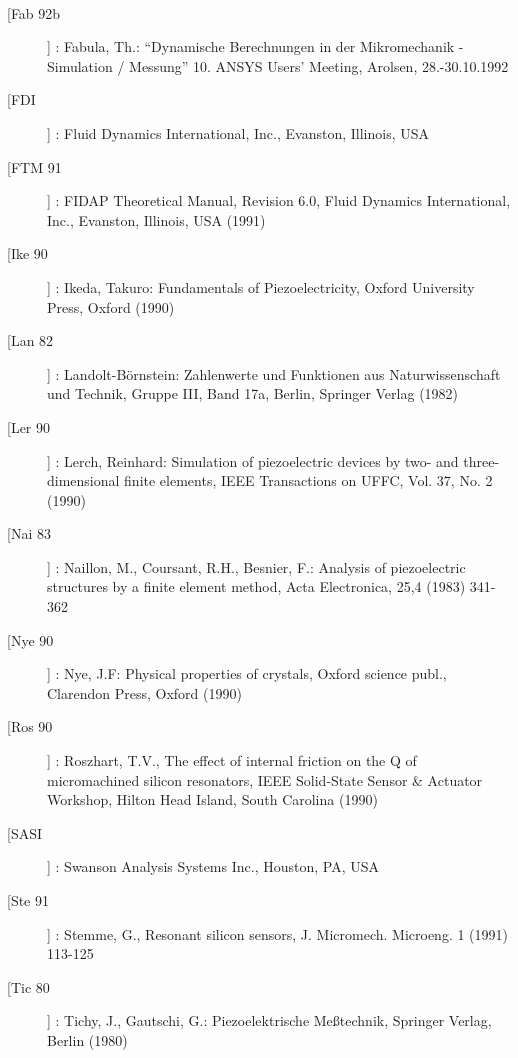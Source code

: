 \begin{description}
\\
\item[[Fab 92b]] : Fabula, Th.: ``Dynamische Berechnungen in der Mikromechanik - Simulation / Messung'' 10.  ANSYS Users' Meeting, Arolsen, 28.-30.10.1992
\\
\item[[FDI]] : Fluid Dynamics International, Inc., Evanston, Illinois, USA
\\
\item[[FTM 91]] : FIDAP Theoretical Manual, Revision 6.0, Fluid Dynamics International, Inc., Evanston, Illinois, USA (1991)
\\
\item[[Ike 90]] : Ikeda, Takuro: Fundamentals of Piezoelectricity, Oxford University Press, Oxford (1990)
\\
\item[[Lan 82]] : Landolt-Börnstein: Zahlenwerte und Funktionen aus Naturwissenschaft und Technik, Gruppe III, Band 17a, Berlin, Springer Verlag (1982)
\\
\item[[Ler 90]] : Lerch, Reinhard: Simulation of piezoelectric devices by two- and three-dimensional finite elements, IEEE Transactions on UFFC, Vol. 37, No. 2 (1990)
\\
\item[[Nai 83]] : Naillon, M., Coursant, R.H., Besnier, F.: Analysis of piezoelectric structures by a finite element method, Acta Electronica, 25,4 (1983) 341-362
\\
\item[[Nye 90]] : Nye, J.F: Physical properties of crystals, Oxford science publ., Clarendon Press, Oxford (1990)
\\
\item[[Ros 90]] : Roszhart, T.V., The effect of internal friction on the Q of micromachined silicon resonators, IEEE Solid-State Sensor \& Actuator Workshop, Hilton Head Island, South Carolina (1990)
\\
\item[[SASI]] : Swanson Analysis Systems Inc., Houston, PA, USA
\\
\item[[Ste 91]] : Stemme, G., Resonant silicon sensors, J. Micromech. Microeng. 1 (1991) 113-125
\\
\item[[Tic 80]] : Tichy, J., Gautschi, G.: Piezoelektrische Meßtechnik, Springer Verlag, Berlin (1980)

\end{description}

